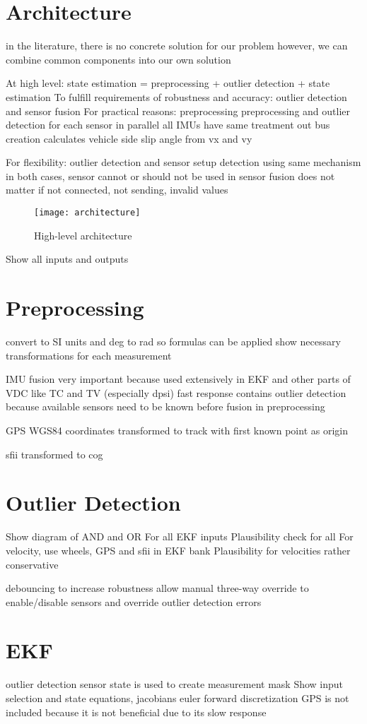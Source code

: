 \section{Architecture}
in the literature, there is no concrete solution for our problem
however, we can combine common components into our own solution

At high level: state estimation = preprocessing + outlier detection + state estimation
To fulfill requirements of robustness and accuracy: outlier detection and sensor fusion
For practical reasons: preprocessing
preprocessing and outlier detection for each sensor in parallel
all IMUs have same treatment
out bus creation calculates vehicle side slip angle from vx and vy

For flexibility: outlier detection and sensor setup detection using same mechanism
in both cases, sensor cannot or should not be used in sensor fusion
does not matter if not connected, not sending, invalid values

\begin{figure}[h]
	\centering
	\texttt{[image: architecture]}%
	\caption{High-level architecture}
	\label{fig:architecture}
\end{figure}
Show all inputs and outputs

\section{Preprocessing}
convert to SI units and deg to rad so formulas can be applied
show necessary transformations for each measurement

IMU fusion
very important because used extensively in EKF and other parts of VDC like TC and TV (especially dpsi)
fast response
contains outlier detection because available sensors need to be known before fusion in preprocessing

GPS WGS84 coordinates transformed to track with first known point as origin

sfii transformed to \gls{cog}

\section{Outlier Detection}
Show diagram of AND and OR
For all EKF inputs
Plausibility check for all
For velocity, use wheels, GPS and sfii in EKF bank
Plausibility for velocities rather conservative

debouncing to increase robustness
allow manual three-way override to enable/disable sensors and override outlier detection errors

\section{EKF}
outlier detection sensor state is used to create measurement mask
Show input selection and state equations, jacobians
euler forward discretization
GPS is not included because it is not beneficial due to its slow response
